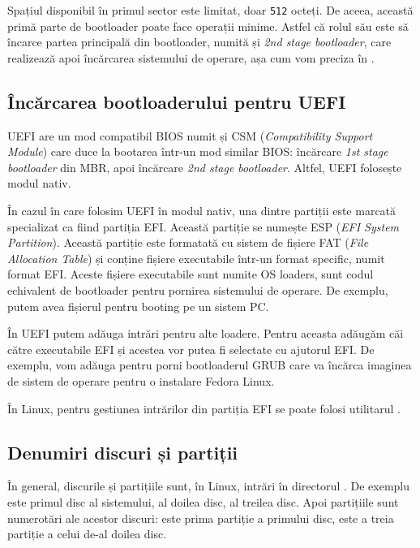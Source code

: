 Spațiul disponibil în primul sector este limitat, doar \texttt{512} octeți. De
aceea, această primă parte de bootloader poate face operații minime. Astfel că rolul său este
să încarce partea principală din bootloader, numită și \textit{2nd stage bootloader},
care realizează apoi încărcarea sistemului de operare, așa cum vom preciza în
.

\subsection{Încărcarea bootloaderului pentru UEFI}
\label{sec:boot:bootdev:uefi}

UEFI are un mod compatibil BIOS numit și CSM  (\textit{Compatibility Support Module}) care duce la bootarea într-un mod similar BIOS:
încărcare \textit{1st stage bootloader} din MBR, apoi încărcare \textit{2nd stage bootloader}.
Altfel, UEFI folosește modul nativ.

În cazul în care folosim UEFI în modul nativ, una dintre partiții este marcată
specializat ca fiind partiția EFI. Această partiție se numește ESP
 (\textit{EFI System Partition}). Această partiție este
formatată cu sistem de fișiere FAT (\textit{File Allocation Table}) și conține fișiere
executabile într-un format specific, numit format EFI. Aceste fișiere
executabile sunt numite OS loaders, sunt codul echivalent de bootloader pentru
pornirea sistemului de operare. De exemplu, putem avea fișierul
 pentru booting pe un sistem PC.

În UEFI putem adăuga intrări pentru alte loadere. Pentru aceasta adăugăm căi
către executabile EFI și acestea vor putea fi selectate cu ajutorul EFI. De exemplu,
vom adăuga  pentru porni bootloaderul GRUB care va încărca
imaginea de sistem de operare pentru o instalare Fedora Linux.

În Linux, pentru gestiunea intrărilor din partiția EFI se poate folosi utilitarul
.

\subsection{Denumiri discuri și partiții}
\label{sec:boot:bootdev:naming}

În general, discurile și partițiile sunt, în Linux, intrări în directorul .
De exemplu  este primul disc al sistemului,  al doilea disc,
 al treilea disc. Apoi partițiile sunt numerotări ale acestor discuri:
 este prima partiție a primului disc,  este a treia partiție a
celui de-al doilea disc.

